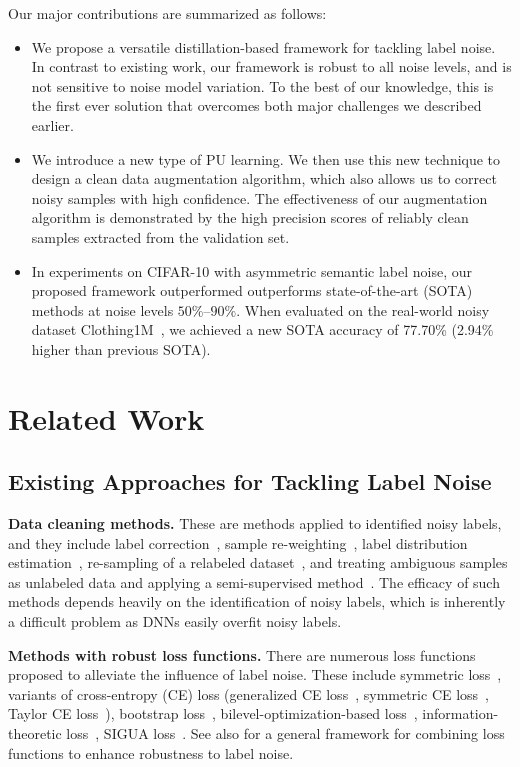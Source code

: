 \documentclass[conference]{IEEEtran}
\begin{document}
Our major contributions are summarized as follows:
\begin{itemize}
\item We propose a versatile distillation-based framework for tackling label noise.
In contrast to existing work, our framework is robust to all noise levels, and is not sensitive to noise model variation. To the best of our knowledge, this is the first ever solution that overcomes both major challenges we described earlier.

\item We introduce a new type of PU learning.
We then use this new technique to design a clean data augmentation algorithm, which also allows us to correct noisy samples with high confidence.
The effectiveness of our augmentation algorithm is demonstrated by the high precision scores of reliably clean samples extracted from the validation set.

\item In experiments on CIFAR-10 \cite{krizhevsky2009learning} with asymmetric semantic label noise, our proposed framework outperformed outperforms state-of-the-art (SOTA) methods at noise levels $50\%$--$90\%$. When evaluated on the real-world noisy dataset Clothing1M~\cite{xiao2015learning}, we achieved a new SOTA accuracy of 77.70\% (2.94\% higher than previous SOTA).
\end{itemize}

\section{Related Work}
\label{sec: related work}
\subsection{Existing Approaches for Tackling Label Noise}
\noindent\textbf{Data cleaning methods.} 
These are methods applied to identified noisy labels, and they include 
label correction~\cite{tanaka2018joint}, sample re-weighting~\cite{shu2019meta, jiang2018mentornet, zhang2019metacleaner}, 
label distribution estimation~\cite{yi2019probabilistic}, re-sampling of a relabeled dataset~\cite{wu2018light}, and treating ambiguous samples as unlabeled data and applying a semi-supervised method~\cite{Ding2018AST}.
The efficacy of such methods depends heavily on the identification of noisy labels, which is inherently a difficult problem as DNNs easily overfit noisy labels.

\noindent\textbf{Methods with robust loss functions.} There are numerous loss functions proposed to alleviate the influence of label noise. These include symmetric loss~\cite{ghosh2017robust}, variants of cross-entropy (CE) loss (generalized CE loss~\cite{wang2019symmetric}, symmetric CE loss~\cite{wang2019symmetric}, Taylor CE loss~\cite{feng2020can}), bootstrap loss~\cite{arazo2019unsupervised, reed2014training}, bilevel-optimization-based loss~\cite{jenni2018deep}, information-theoretic loss~\cite{xu2019l_dmi}, SIGUA loss~\cite{han2020sigua}. See also \cite{ma2020normalized} for a general framework for combining loss functions to enhance robustness to label noise.
\end{document}
